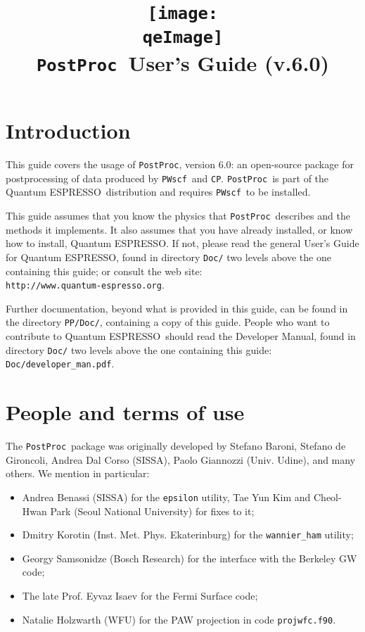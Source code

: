\documentclass[12pt,a4paper]{article}
\def\version{6.0}
\def\qe{{\sc Quantum ESPRESSO}}
\def\PWscf{\texttt{PWscf}}
\def\CP{\texttt{CP}}
\def\PostProc{\texttt{PostProc}}
\begin{document}
 
\author{}
\date{}

\def\qeImage{../../Doc/quantum_espresso.pdf}

\title{
  \texttt{[image: \\qeImage]} \\
  \Huge \PostProc\ User's Guide (v.\version) 
}

\maketitle

\tableofcontents

\section{Introduction}

This guide covers the usage of \PostProc, version \version: 
an open-source package for postprocessing of data produced by
\PWscf\ and \CP. \PostProc\ is part of the \qe\ distribution 
and requires \PWscf\ to be installed.

This guide assumes that you know the physics 
that \PostProc\ describes and the methods it implements.
It also assumes  that you have already installed,
or know how to install, \qe. If not, please read
the general User's Guide for \qe, found in 
directory \texttt{Doc/} two levels above the 
one containing this guide; or consult the web site:\\
\texttt{http://www.quantum-espresso.org}.

Further documentation, beyond what is provided 
in this guide, can be found in the directory
\texttt{PP/Doc/}, containing a copy of this guide.
People who want to contribute to \qe\ should read the 
Developer Manual, found in directory \texttt{Doc/} two levels
above the one containing this guide: \texttt{Doc/developer\_man.pdf}.

\section{People and terms of use}

The \PostProc\ package was originally developed by Stefano Baroni, 
Stefano de Gironcoli, Andrea Dal Corso (SISSA), Paolo Giannozzi 
(Univ. Udine), and many others. We mention in particular: 
\begin{itemize}
\item Andrea Benassi (SISSA) for the \texttt{epsilon} utility,
      Tae Yun Kim and Cheol-Hwan Park (Seoul National University)
      for fixes to it;
\item Dmitry Korotin (Inst. Met. Phys. Ekaterinburg) for the
      \texttt{wannier\_ham} utility;
\item Georgy Samsonidze (Bosch Research) for the interface
      with the Berkeley GW code;
\item The late Prof. Eyvaz Isaev for the Fermi Surface code;
\item Natalie Holzwarth (WFU) for the PAW projection in code
     \texttt{projwfc.f90}.
\end{itemize}
\end{document}
